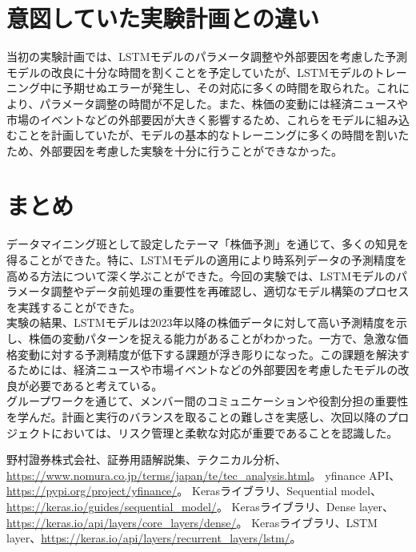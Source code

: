 \documentclass[a4paper, 11pt, titlepage]{jsarticle}
\begin{document}
\section{意図していた実験計画との違い}
\indent 当初の実験計画では、LSTMモデルのパラメータ調整や外部要因を考慮した予測モデルの改良に十分な時間を割くことを予定していたが、LSTMモデルのトレーニング中に予期せぬエラーが発生し、その対応に多くの時間を取られた。これにより、パラメータ調整の時間が不足した。また、株価の変動には経済ニュースや市場のイベントなどの外部要因が大きく影響するため、これらをモデルに組み込むことを計画していたが、モデルの基本的なトレーニングに多くの時間を割いたため、外部要因を考慮した実験を十分に行うことができなかった。

\section{まとめ}
\indent データマイニング班として設定したテーマ「株価予測」を通じて、多くの知見を得ることができた。特に、LSTMモデルの適用により時系列データの予測精度を高める方法について深く学ぶことができた。今回の実験では、LSTMモデルのパラメータ調整やデータ前処理の重要性を再確認し、適切なモデル構築のプロセスを実践することができた。\\
\indent 実験の結果、LSTMモデルは2023年以降の株価データに対して高い予測精度を示し、株価の変動パターンを捉える能力があることがわかった。一方で、急激な価格変動に対する予測精度が低下する課題が浮き彫りになった。この課題を解決するためには、経済ニュースや市場イベントなどの外部要因を考慮したモデルの改良が必要であると考えている。\\
\indent グループワークを通じて、メンバー間のコミュニケーションや役割分担の重要性を学んだ。計画と実行のバランスを取ることの難しさを実感し、次回以降のプロジェクトにおいては、リスク管理と柔軟な対応が重要であることを認識した。







\begin{thebibliography}{99}
   野村證券株式会社、証券用語解説集、テクニカル分析、\url{https://www.nomura.co.jp/terms/japan/te/tec_analysis.html}。
   yfinance API、\url{https://pypi.org/project/yfinance/}。
   Kerasライブラリ、Sequential model、\url{https://keras.io/guides/sequential_model/}。
   Kerasライブラリ、Dense layer、\url{https://keras.io/api/layers/core_layers/dense/}。
   Kerasライブラリ、LSTM layer、\url{https://keras.io/api/layers/recurrent_layers/lstm/}。
  
\end{thebibliography}
\end{document}
